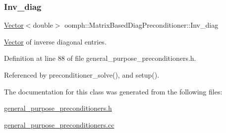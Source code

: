 \subsubsection{\texorpdfstring{Inv\+\_\+diag}{Inv\_diag}}
{\footnotesize\ttfamily \hyperlink{classoomph_1_1Vector}{Vector}$<$double$>$ oomph\+::\+Matrix\+Based\+Diag\+Preconditioner\+::\+Inv\+\_\+diag\hspace{0.3cm}{\ttfamily [private]}}



\hyperlink{classoomph_1_1Vector}{Vector} of inverse diagonal entries. 



Definition at line 88 of file general\+\_\+purpose\+\_\+preconditioners.\+h.



Referenced by preconditioner\+\_\+solve(), and setup().



The documentation for this class was generated from the following files\+:\begin{DoxyCompactItemize}
\item 
\hyperlink{general__purpose__preconditioners_8h}{general\+\_\+purpose\+\_\+preconditioners.\+h}\item 
\hyperlink{general__purpose__preconditioners_8cc}{general\+\_\+purpose\+\_\+preconditioners.\+cc}\end{DoxyCompactItemize}
